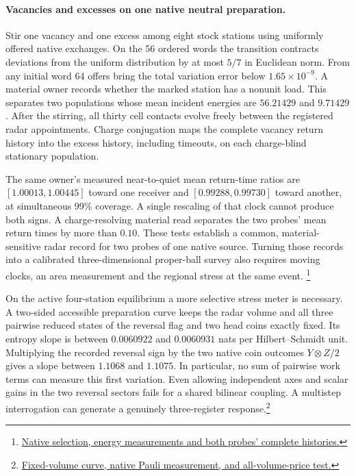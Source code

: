 \documentclass[11pt]{article}
\begin{document}
\paragraph{Vacancies and excesses on one native neutral preparation.}
Stir one vacancy and one excess among eight stock stations using
uniformly offered native exchanges. On the 56 ordered words the
transition contracts deviations from the uniform distribution by at
most $5/7$ in Euclidean norm. From any initial word 64 offers bring
the total variation error below $1.65\times10^{-9}$. A material owner
records whether the marked station has a nonunit load. This separates
two populations whose mean incident energies are $56.21429$ and
$9.71429$. After the stirring, all thirty cell contacts evolve freely
between the registered radar appointments. Charge conjugation maps
the complete vacancy return history into the excess history, including
timeouts, on each charge-blind stationary population.

The same owner's measured near-to-quiet mean return-time ratios are
$[1.00013,1.00445]$ toward one receiver and $[0.99288,0.99730]$
toward another, at simultaneous 99\% coverage. A single rescaling
of that clock cannot produce both signs. A charge-resolving material
read separates the two probes' mean return times by more than $0.10$.
These tests establish a common, material-sensitive radar record for two
probes of one native source. Turning those records into a calibrated
three-dimensional proper-ball survey also requires moving clocks,
an area measurement and the regional stress at the same event.
\footnote{\href{https://github.com/FloatingPragma/observer-patch-holography/tree/main/model/experiments/interval_echo_einstein_station/critical_exchange/neutral_cell}{Native selection, energy measurements and both probes' complete histories.}}

On the active four-station equilibrium a more selective stress meter
is necessary. A two-sided accessible preparation curve keeps the radar
volume and all three pairwise reduced states of the reversal flag and
two head coins exactly fixed. Its entropy slope is between $0.0060922$
and $0.0060931$ nats per Hilbert--Schmidt unit. Multiplying the recorded
reversal sign by the two native coin outcomes $Y\otimes Z/2$ gives a
slope between $1.1068$ and $1.1075$. In particular, no sum of pairwise
work terms can measure this first variation. Even allowing independent
axes and scalar gains in the two reversal sectors fails for a shared
bilinear coupling. A multistep interrogation can generate a genuinely
three-register response.\footnote{\href{https://github.com/FloatingPragma/observer-patch-holography/tree/main/code/matched_einstein_limit/source_implication/full_algebra/correlation_rank/shared_action}{Fixed-volume curve, native Pauli measurement, and all-volume-price test.}}
\end{document}
